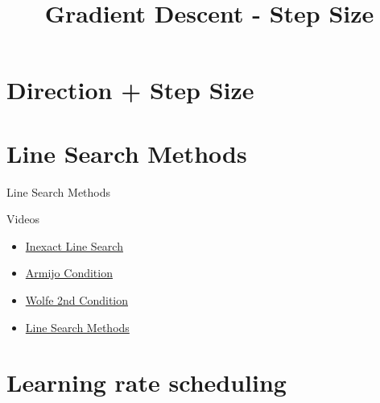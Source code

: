 \documentclass{beamer}
\title{Gradient Descent - Step Size}
\author{ }
\date{ }
\begin{document}
\begin{frame}
   	\titlepage
\end{frame}


\section{Direction + Step Size}






\section{Line Search Methods}
\begin{frame}
	\centering
	\Huge Line Search Methods

\end{frame}

\begin{frame}{Videos}
	
\begin{itemize}
    \item \href{https://www.youtube.com/watch?v=MzmqM0tuO1Q&list=PL10NOnsbP5Q7wNrYItE2GhKq05cVov97e&index=4}{\textcolor{linkblue}{Inexact Line Search}}
    
    \item \href{https://www.youtube.com/watch?v=X4Pjd-1R-jI&list=PL10NOnsbP5Q7wNrYItE2GhKq05cVov97e&index=6}{\textcolor{linkblue}{Armijo Condition}}
    
    \item \href{https://www.youtube.com/watch?v=5upFcYJqSwo&list=PL10NOnsbP5Q7wNrYItE2GhKq05cVov97e&index=7}{\textcolor{linkblue}{Wolfe 2nd Condition}}
    
    \item \href{https://www.youtube.com/watch?v=sXMi1D2E9QQ&list=PL10NOnsbP5Q7wNrYItE2GhKq05cVov97e&index=9}{\textcolor{linkblue}{Line Search Methods}}
\end{itemize}

\end{frame}





\section{Learning rate scheduling}
\end{document}
